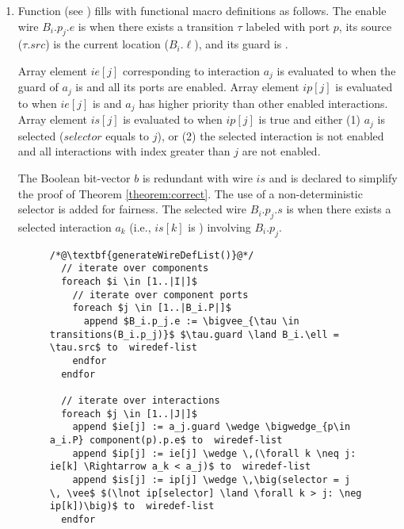 \begin{enumerate}
\begin{figure}
\begin{lstlisting}
  foreach $i \in [1..|I|]$
    foreach $j \in [1..|B_i.P|]$ 
      // port enablement
      append $wire~bool~B_i.p_j.e$ to  decl-list 
      // port selected
      append $wire~bool~B_i.p_j.s$ to  decl-list 
    endfor

    // location registers
    append $int~B_i.\ell$ to decl-list
    
    foreach $j \in [1..|B_i.X|]$ 
      // variable registers
      append $int~B_i.x_j$ to  decl-list 
    endfor
  endfor
\end{lstlisting}
\caption{ function.}
\label{fig:generate-decl-list}
\end{figure}
%
\item Function  (see ) fills  with functional macro definitions as follows.
The enable wire $B_i.p_j.e$ is \true when there exists a transition $\tau$ labeled with port $p$, its source ($\tau.\mathit{src}$) is the current location ($B_i.\ell$), and its guard is \true. 

Array element $\mathit{ie}[j]$ corresponding to interaction $a_j$ is evaluated to \true when the guard of $a_j$ is \true and all its ports are enabled.
Array element $ip[j]$ is evaluated to \true when $ie[j]$ is \true and $a_j$ has higher priority than other enabled interactions. 
Array element $is[j]$ is evaluated to \true when $ip[j]$ is true and either (1) $a_j$ is selected ($selector$ equals to $j$), or (2) the selected interaction is not enabled and all interactions with index greater than $j$ are not enabled. 

The Boolean bit-vector $b$ is redundant with wire $is$ and is declared to simplify the proof of Theorem \ref{theorem:correct}. 
The use of a non-deterministic selector is added for fairness. 
The selected wire $B_i.p_j.s$ is \true when there exists a selected interaction $a_k$ (i.e., $is[k]$ is \true) involving $B_i.p_j$.
%
\begin{figure}
\begin{lstlisting}
/*@\textbf{generateWireDefList()}@*/
  // iterate over components
  foreach $i \in [1..|I|]$ 
    // iterate over component ports
    foreach $j \in [1..|B_i.P|]$ 
      append $B_i.p_j.e := \bigvee_{\tau \in transitions(B_i.p_j)}$ $\tau.guard \land B_i.\ell = \tau.src$ to  wiredef-list 
    endfor
  endfor
  
  // iterate over interactions
  foreach $j \in [1..|J|]$ 
    append $ie[j] := a_j.guard \wedge \bigwedge_{p\in a_i.P} component(p).p.e$ to  wiredef-list 
    append $ip[j] := ie[j] \wedge \,(\forall k \neq j: ie[k] \Rightarrow a_k < a_j)$ to  wiredef-list 
    append $is[j] := ip[j] \wedge \,\big(selector = j \, \vee$ $(\lnot ip[selector] \land \forall k > j: \neg ip[k])\big)$ to  wiredef-list 
  endfor
  

\end{lstlisting}
\end{figure}
\end{enumerate}
